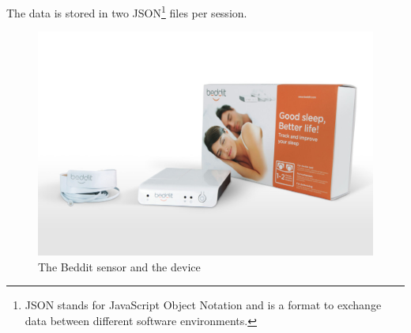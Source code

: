 			The data is stored in two JSON\footnote{JSON stands for JavaScript Object Notation and is a format to exchange data between different software environments.\cite{json}} files per session.

			\begin{figure}[h]
				\centering
					\includegraphics[scale=0.25]{beddit.jpg}
					
					\caption{The Beddit sensor and the device\cite{beddit}}

			\end{figure}



